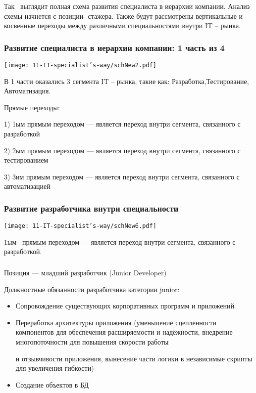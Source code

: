 \documentclass{../industrial-development}
\begin{document}
Так~\cite{mc} выглядит полная схема развития специалиста в иерархии компании. Анализ схемы начнется с позиции- стажера. Также  будут рассмотрены вертикальные и косвенные переходы между различными специальностями внутри IT -- рынка. 

\begin{frame} \frametitle{Развитие  специалиста в иерархии компании: 1 часть из 4 }
  \centerline{\texttt{[image: 11-IT-specialist's-way/schNew2.pdf]}}
\end{frame}

\lecturenotes

В 1 части оказались 3 сегмента IT -- рынка, такие как: Разработка,Тестирование, Автоматизация.

Прямые переходы:

1) 1ым прямым переходом --- является переход внутри сегмента, связанного с разработкой

2) 2ым прямым переходом --- является переход внутри сегмента, связанного с тестированием

3) 3им прямым переходом --- является переход внутри сегмента, связанного с автоматизацией


\begin{frame} \frametitle{ Развитие разработчика внутри специальности}
 \centerline{\texttt{[image: 11-IT-specialist's-way/schNew6.pdf]}}
\end{frame}

\lecturenotes
 
1ым~\cite{mc} прямым переходом --- является переход внутри сегмента, связанного с разработкой. 

\begin{frame} \frametitle{}
 \begin{block}{}
  \alert{Позиция --- младший разработчик (Junior Developer)}

Должностные обязанности разработчика категории junior: 
  \end{block}
  \begin{itemize}
  \item Сопровождение существующих корпоративных программ и приложений
  \item Переработка архитектуры приложения (уменьшение сцепленности компонентов для обеспечения расширяемости и надёжности, внедрение многопоточности для повышения скорости работы 

и отзывчивости приложения, вынесение части логики в независимые скрипты для увеличения гибкости)
  \item Создание объектов в БД
  \end{itemize}
\end{frame}
\end{document}
